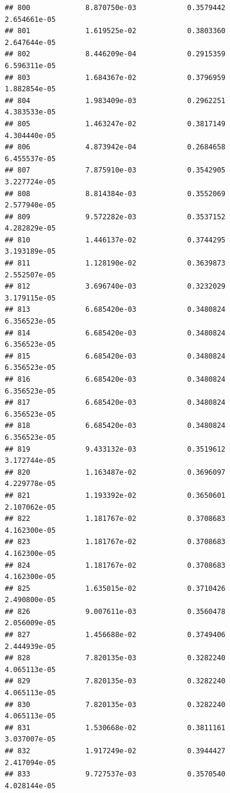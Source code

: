 \documentclass[
]{article}
\begin{document}
\begin{verbatim}
## 800             8.870750e-03            0.3579442            2.654661e-05
## 801             1.619525e-02            0.3803360            2.647644e-05
## 802             8.446209e-04            0.2915359            6.596311e-05
## 803             1.684367e-02            0.3796959            1.882854e-05
## 804             1.983409e-03            0.2962251            4.383533e-05
## 805             1.463247e-02            0.3817149            4.304440e-05
## 806             4.873942e-04            0.2684658            6.455537e-05
## 807             7.875910e-03            0.3542905            3.227724e-05
## 808             8.814384e-03            0.3552069            2.577940e-05
## 809             9.572282e-03            0.3537152            4.282829e-05
## 810             1.446137e-02            0.3744295            3.193189e-05
## 811             1.128190e-02            0.3639873            2.552507e-05
## 812             3.696740e-03            0.3232029            3.179115e-05
## 813             6.685420e-03            0.3480824            6.356523e-05
## 814             6.685420e-03            0.3480824            6.356523e-05
## 815             6.685420e-03            0.3480824            6.356523e-05
## 816             6.685420e-03            0.3480824            6.356523e-05
## 817             6.685420e-03            0.3480824            6.356523e-05
## 818             6.685420e-03            0.3480824            6.356523e-05
## 819             9.433132e-03            0.3519612            3.172744e-05
## 820             1.163487e-02            0.3696097            4.229778e-05
## 821             1.193392e-02            0.3650601            2.107062e-05
## 822             1.181767e-02            0.3708683            4.162300e-05
## 823             1.181767e-02            0.3708683            4.162300e-05
## 824             1.181767e-02            0.3708683            4.162300e-05
## 825             1.635015e-02            0.3710426            2.490800e-05
## 826             9.007611e-03            0.3560478            2.056009e-05
## 827             1.456688e-02            0.3749406            2.444939e-05
## 828             7.820135e-03            0.3282240            4.065113e-05
## 829             7.820135e-03            0.3282240            4.065113e-05
## 830             7.820135e-03            0.3282240            4.065113e-05
## 831             1.530668e-02            0.3811161            3.037007e-05
## 832             1.917249e-02            0.3944427            2.417094e-05
## 833             9.727537e-03            0.3570540            4.028144e-05

\end{verbatim}
\end{document}
